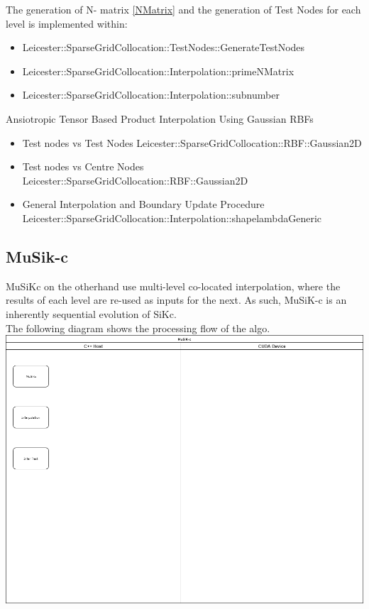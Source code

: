 \documentclass[a4paper]{amsart}
\begin{document}
The generation of N- matrix \ref{NMatrix} and the generation of Test Nodes for each level is implemented within:
\begin{itemize}
\item Leicester::SparseGridCollocation::TestNodes::GenerateTestNodes
\item Leicester::SparseGridCollocation::Interpolation::primeNMatrix
\item Leicester::SparseGridCollocation::Interpolation::subnumber
\end{itemize}

Ansiotropic Tensor Based Product Interpolation Using Gaussian RBFs
\begin{itemize}
\item Test nodes vs Test Nodes Leicester::SparseGridCollocation::RBF::Gaussian2D
\item Test nodes vs Centre Nodes Leicester::SparseGridCollocation::RBF::Gaussian2D
\item General Interpolation and Boundary Update Procedure Leicester::SparseGridCollocation::Interpolation::shapelambdaGeneric
\end{itemize}




\subsection{MuSik-c}
MuSiKc on the otherhand use multi-level co-located interpolation, where the results of each level are re-used as inputs for the next. As such, MuSiK-c is an inherently sequential evolution of SiKc.\\
 The following diagram shows the processing flow of the algo.\\

\includegraphics[scale=0.3]{MuSiKc1.png}
\end{document}
